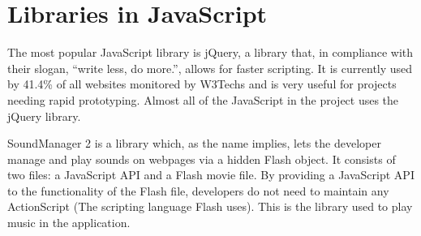 \section{Libraries in JavaScript}
The most popular JavaScript library is jQuery\cite{jquery11}, 
a library that, in compliance with their slogan, ``write less, do more.'', 
allows for faster scripting. It is currently used by 41.4\% of all
websites monitored by W3Techs \cite{W3Tech11} and is very useful for projects
needing rapid prototyping. Almost all of the JavaScript in the project uses the jQuery library.

SoundManager 2\cite{Schiller07} is a library which, as the name implies, lets the developer
manage and play sounds on webpages via a hidden Flash object. It consists of two
files: a JavaScript API and a Flash movie file. By providing a
JavaScript API to the functionality of the Flash file, developers do not need to
maintain any ActionScript (The scripting language Flash uses). 
This is the library used to play music in the application.